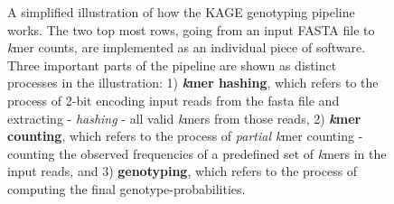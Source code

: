 \begin{figure}[H]
\begin{center}
{
}
\caption{
  A simplified illustration of how the KAGE genotyping pipeline works.
  The two top most rows, going from an input FASTA file to \textit{k}mer counts, are implemented as an individual piece of software.
  Three important parts of the pipeline are shown as distinct processes in the illustration: 
  1) \textbf{\textit{k}mer hashing}, which refers to the process of 2-bit encoding input reads from the fasta file and extracting - \textit{hashing} - all valid \textit{k}mers from those reads, 
  2) \textbf{\textit{k}mer counting}, which refers to the process of \textit{partial k}mer counting - counting the observed frequencies of a predefined set of \textit{k}mers in the input reads, and 
  3) \textbf{genotyping}, which refers to the process of computing the final genotype-probabilities.
}
\label{background:kage:figures:pipeline}
\end{center}
\end{figure}

